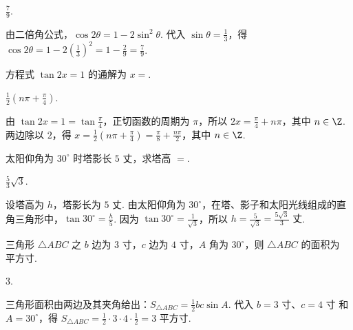 \begin{answer}
\(\frac{7}{9}\).
\end{answer}

\begin{solution}
由二倍角公式，\(\cos2\theta=1-2\sin^{2}\theta\). 代入 \(\sin\theta=\frac13\)，得 \(\cos2\theta=1-2\left(\frac13\right)^{2}=1-\frac29=\frac79\).
\end{solution}

\begin{problem}
方程式 \(\tan 2x = 1\) 的通解为 \(x=\)\fillinblank{}.
\end{problem}

\begin{answer}
\(\frac{1}{2}\left( n\pi + \frac{\pi}{4} \right)\).
\end{answer}

\begin{solution}
由 \(\tan2x=1=\tan\frac{\pi}{4}\)，正切函数的周期为 \(\pi\)，所以 \(2x=\frac{\pi}{4}+n\pi\)，其中 \(n\in\Z\). 两边除以 \(2\)，得 \(x=\frac12\left(n\pi+\frac{\pi}{4}\right)=\frac{\pi}{8}+\frac{n\pi}{2}\)，其中 \(n\in\Z\).
\end{solution}

\begin{problem}
太阳仰角为 \(30^{\circ}\) 时塔影长 \(5\text{ 丈}\)，求塔高 \(=\)\fillinblank{}.
\end{problem}

\begin{answer}
\(\frac{5}{3}\sqrt{3}\).
\end{answer}

\begin{solution}
设塔高为 \(h\)，塔影长为 \(5\text{ 丈}\). 由太阳仰角为 \(30^{\circ}\)，在塔、影子和太阳光线组成的直角三角形中，\(\tan30^{\circ}=\frac{h}{5}\). 因为 \(\tan30^{\circ}=\frac{1}{\sqrt3}\)，所以 \(h=\frac{5}{\sqrt3}=\frac{5\sqrt3}{3}\text{ 丈}\).
\end{solution}

\begin{problem}
三角形 \(\triangle ABC\) 之 \(b\) 边为 \(3\text{ 寸}\)，\(c\) 边为 \(4\text{ 寸}\)，\(A\) 角为 \(30^{\circ}\)，则 \(\triangle ABC\) 的面积为\fillinblank{}\(\text{平方寸}\).
\end{problem}

\begin{answer}
\(3\).
\end{answer}

\begin{solution}
三角形面积由两边及其夹角给出：\(S_{\triangle ABC}=\frac12bc\sin A\). 代入 \(b=3\text{ 寸}\)、\(c=4\text{ 寸}\) 和 \(A=30^{\circ}\)，得 \(S_{\triangle ABC}=\frac12\cdot3\cdot4\cdot\frac12=3\text{ 平方寸}\).
\end{solution}

